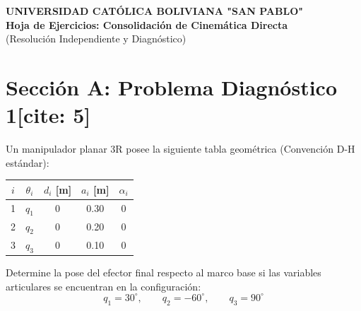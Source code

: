 \documentclass[11pt, a4paper]{article}
\begin{document}
\begin{center}
    \Large\textbf{\textcolor{ucbblue}{UNIVERSIDAD CATÓLICA BOLIVIANA "SAN PABLO"}}\\
    \vspace{0.2cm}
    \normalsize \textbf{Hoja de Ejercicios: Consolidación de Cinemática Directa} \\
    (Resolución Independiente y Diagnóstico)
\end{center}

\vspace{0.4cm}

\section*{Sección A: Problema Diagnóstico 1[cite: 5]}
Un manipulador planar 3R posee la siguiente tabla geométrica (Convención D-H estándar):

\begin{center}
    \begin{tabular}{c c c c c}
    \toprule
    $i$ & $\theta_i$ & $d_i$ [m] & $a_i$ [m] & $\alpha_i$ \\ \midrule
    1 & $q_1$ & 0 & 0.30 & 0 \\
    2 & $q_2$ & 0 & 0.20 & 0 \\
    3 & $q_3$ & 0 & 0.10 & 0 \\ \bottomrule
    \end{tabular}
\end{center}

Determine la pose del efector final respecto al marco base si las variables articulares se encuentran en la configuración:
\begin{equation*}
    q_1=30^\circ, \qquad q_2=-60^\circ, \qquad q_3=90^\circ
\end{equation*}

\vspace{5cm}
\end{document}
